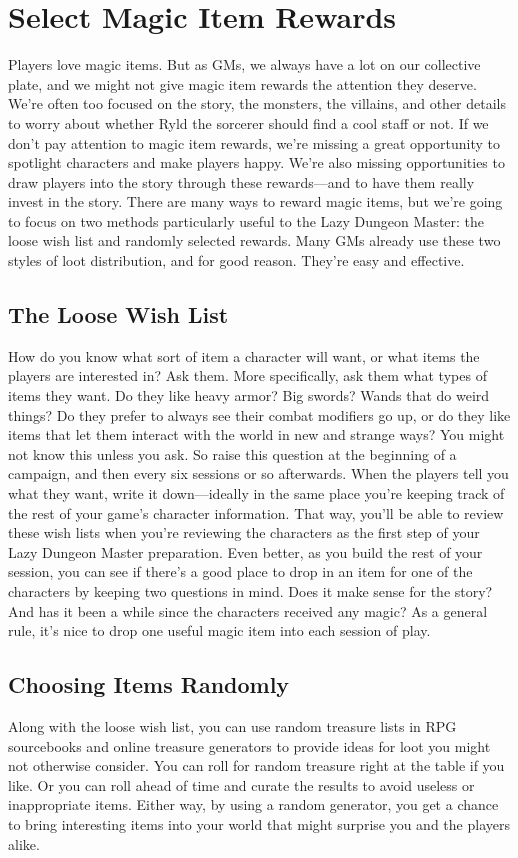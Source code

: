 \documentclass[10pt,a4paper,twoside,bg=print,twocolumn,openany,nodeprecatedcode]{dndbook}
\begin{document}
\section{Select Magic Item Rewards}
Players love magic items. But as GMs, we always have a lot on our collective plate, and we might not give magic item rewards the attention they deserve. We're often too focused on the story, the monsters, the villains, and other details to worry about whether Ryld the sorcerer should find a cool staff or not.
If we don't pay attention to magic item rewards, we're missing a great opportunity to spotlight characters and make players happy. We're also missing opportunities to draw players into the story through these rewards—and to have them really invest in the story.
There are many ways to reward magic items, but we're going to focus on two methods particularly useful to the Lazy Dungeon Master: the loose wish list and randomly selected rewards. Many GMs already use these two styles of loot distribution, and for good reason. They're easy and effective.
\subsection{The Loose Wish List}
How do you know what sort of item a character will want, or what items the players are interested in? Ask them.
More specifically, ask them what types of items they want. Do they like heavy armor? Big swords? Wands that do weird things? Do they prefer to always see their combat modifiers go up, or do they like items that let them interact with the world in new and strange ways?
You might not know this unless you ask. So raise this question at the beginning of a campaign, and then every six sessions or so afterwards. When the players tell you what they want, write it down—ideally in the same place you're keeping track of the rest of your game's character information. That way, you'll be able to review these wish lists when you're reviewing the characters as the first step of your Lazy Dungeon Master preparation.
Even better, as you build the rest of your session, you can see if there's a good place to drop in an item for one of the characters by keeping two questions in mind. Does it make sense for the story? And has it been a while since the characters received any magic? As a general rule, it's nice to drop one useful magic item into each session of play.
\subsection{Choosing Items Randomly}
Along with the loose wish list, you can use random treasure lists in RPG sourcebooks and online treasure generators to provide ideas for loot you might not otherwise consider. You can roll for random treasure right at the table if you like. Or you can roll ahead of time and curate the results to avoid useless or inappropriate items. Either way, by using a random generator, you get a chance to bring interesting items into your world that might surprise you and the players alike.
\end{document}
